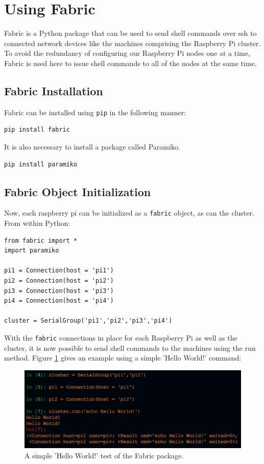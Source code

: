 \documentclass[sigconf]{acmart}
\begin{document}
\section{Using Fabric}
Fabric is a Python package that can be used to send shell commands over ssh to connected network devices like the machines comprising the Raspberry Pi cluster\cite{fabric2018}. To avoid the redundancy of configuring our Raspberry Pi nodes one at a time, Fabric is used here to issue shell commands to all of the nodes at the same time.
\subsection{Fabric Installation}
Fabric can be installed using {\tt pip} in the following manner:
\begin{lstlisting}
pip install fabric
\end{lstlisting}
It is also necessary to install a package called Paramiko.
\begin{lstlisting}
pip install paramiko
\end{lstlisting}

\subsection{Fabric Object Initialization}
Now, each raspberry pi can be initialized as a {\tt fabric} object, as can the cluster. From within Python:
\begin{lstlisting}
from fabric import *
import paramiko

pi1 = Connection(host = 'pi1')
pi2 = Connection(host = 'pi2')
pi3 = Connection(host = 'pi3')
pi4 = Connection(host = 'pi4')

cluster = SerialGroup('pi1','pi2','pi3','pi4')

\end{lstlisting}
With the {\tt fabric} connections in place for each Raspberry Pi as well as the cluster, it is now possible to send shell commands to the machines using the run method. Figure \ref{f:fabricTest} gives an example using a simple 'Hello World!' command:
\begin{figure}[!ht]
  \centering\includegraphics[width=\columnwidth]{images/fabricTest.png}
  \caption{A simple 'Hello World!' test of the Fabric package.}\label{f:fabricTest}
\end{figure}
\end{document}
